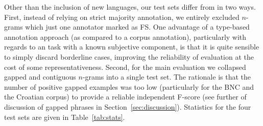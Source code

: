 \documentclass[11pt,letterpaper]{article}
\newcommand{\tabref}[2][]{Table#1~\ref{#2}\xspace}
\newcommand{\secref}[2][]{Section#1~\ref{#2}\xspace}
\begin{document}
Other than the inclusion of new languages, our test sets differ from  in two ways. First, instead of relying on strict majority annotation, we entirely excluded $n$-grams which just one annotator marked as FS. One advantage of a type-based annotation approach (as compared to a corpus annotation), particularly with regards to an task with a known subjective component, is that it is quite sensible to simply discard borderline cases, improving the reliability of evaluation at the cost of some representativeness.  Second, for the main evaluation we collapsed gapped and contiguous $n$-grams into a single test set. The rationale is that the number of positive gapped examples was too low (particularly for the BNC and the Croatian corpus) to provide a reliable independent F-score (see further of discussion of gapped phrases in \secref{sec:discussion}). Statistics for the four test sets are given in \tabref{tab:stats}.
\end{document}
